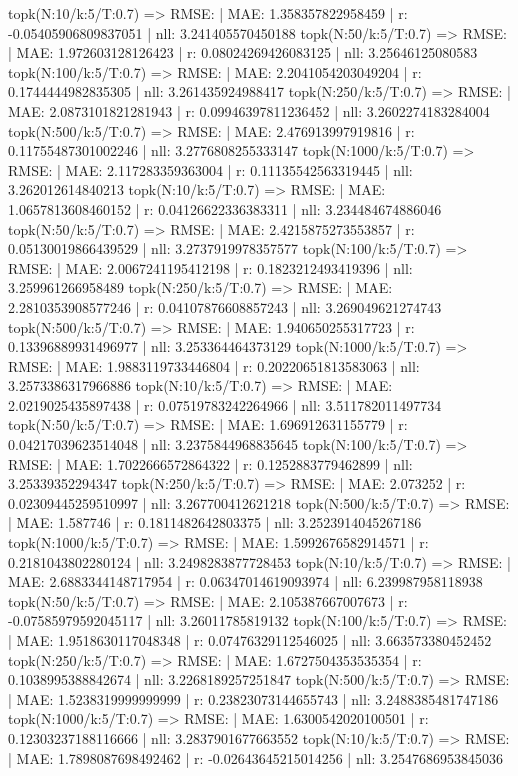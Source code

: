 topk(N:10/k:5/T:0.7) => RMSE: | MAE: 1.358357822958459 | r: -0.05405906809837051 | nll: 3.241405570450188
topk(N:50/k:5/T:0.7) => RMSE: | MAE: 1.972603128126423 | r: 0.08024269426083125 | nll: 3.25646125080583
topk(N:100/k:5/T:0.7) => RMSE: | MAE: 2.2041054203049204 | r: 0.1744444982835305 | nll: 3.261435924988417
topk(N:250/k:5/T:0.7) => RMSE: | MAE: 2.0873101821281943 | r: 0.09946397811236452 | nll: 3.2602274183284004
topk(N:500/k:5/T:0.7) => RMSE: | MAE: 2.476913997919816 | r: 0.11755487301002246 | nll: 3.2776808255333147
topk(N:1000/k:5/T:0.7) => RMSE: | MAE: 2.117283359363004 | r: 0.11135542563319445 | nll: 3.262012614840213
topk(N:10/k:5/T:0.7) => RMSE: | MAE: 1.0657813608460152 | r: 0.04126622336383311 | nll: 3.234484674886046
topk(N:50/k:5/T:0.7) => RMSE: | MAE: 2.4215875273553857 | r: 0.05130019866439529 | nll: 3.2737919978357577
topk(N:100/k:5/T:0.7) => RMSE: | MAE: 2.0067241195412198 | r: 0.1823212493419396 | nll: 3.259961266958489
topk(N:250/k:5/T:0.7) => RMSE: | MAE: 2.2810353908577246 | r: 0.04107876608857243 | nll: 3.269049621274743
topk(N:500/k:5/T:0.7) => RMSE: | MAE: 1.940650255317723 | r: 0.13396889931496977 | nll: 3.253364464373129
topk(N:1000/k:5/T:0.7) => RMSE: | MAE: 1.9883119733446804 | r: 0.20220651813583063 | nll: 3.2573386317966886
topk(N:10/k:5/T:0.7) => RMSE: | MAE: 2.0219025435897438 | r: 0.07519783242264966 | nll: 3.511782011497734
topk(N:50/k:5/T:0.7) => RMSE: | MAE: 1.696912631155779 | r: 0.04217039623514048 | nll: 3.2375844968835645
topk(N:100/k:5/T:0.7) => RMSE: | MAE: 1.7022666572864322 | r: 0.1252883779462899 | nll: 3.25339352294347
topk(N:250/k:5/T:0.7) => RMSE: | MAE: 2.073252 | r: 0.02309445259510997 | nll: 3.267700412621218
topk(N:500/k:5/T:0.7) => RMSE: | MAE: 1.587746 | r: 0.1811482642803375 | nll: 3.2523914045267186
topk(N:1000/k:5/T:0.7) => RMSE: | MAE: 1.5992676582914571 | r: 0.2181043802280124 | nll: 3.2498283877728453
topk(N:10/k:5/T:0.7) => RMSE: | MAE: 2.6883344148717954 | r: 0.06347014619093974 | nll: 6.239987958118938
topk(N:50/k:5/T:0.7) => RMSE: | MAE: 2.105387667007673 | r: -0.07585979592045117 | nll: 3.26011785819132
topk(N:100/k:5/T:0.7) => RMSE: | MAE: 1.9518630117048348 | r: 0.07476329112546025 | nll: 3.663573380452452
topk(N:250/k:5/T:0.7) => RMSE: | MAE: 1.6727504353535354 | r: 0.1038995388842674 | nll: 3.2268189257251847
topk(N:500/k:5/T:0.7) => RMSE: | MAE: 1.5238319999999999 | r: 0.23823073144655743 | nll: 3.2488385481747186
topk(N:1000/k:5/T:0.7) => RMSE: | MAE: 1.6300542020100501 | r: 0.12303237188116666 | nll: 3.2837901677663552
topk(N:10/k:5/T:0.7) => RMSE: | MAE: 1.7898087698492462 | r: -0.02643645215014256 | nll: 3.2547686953845036
